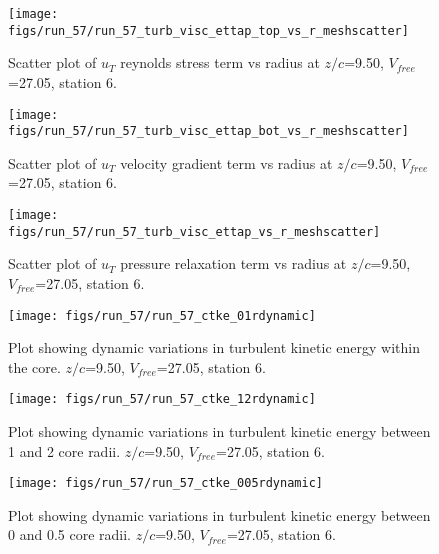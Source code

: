 \begin{figure}[H]
\centering
\texttt{[image: figs/run\_57/run\_57\_turb\_visc\_ettap\_top\_vs\_r\_meshscatter]}
\caption{Scatter plot of $
u_T$ reynolds stress term vs radius at $z/c$=9.50, $V_{free}$=27.05, station 6.}
\label{fig:run_57_turb_visc_ettap_top_vs_r_meshscatter}
\end{figure}


\begin{figure}[H]
\centering
\texttt{[image: figs/run\_57/run\_57\_turb\_visc\_ettap\_bot\_vs\_r\_meshscatter]}
\caption{Scatter plot of $
u_T$ velocity gradient term vs radius at $z/c$=9.50, $V_{free}$=27.05, station 6.}
\label{fig:run_57_turb_visc_ettap_bot_vs_r_meshscatter}
\end{figure}


\begin{figure}[H]
\centering
\texttt{[image: figs/run\_57/run\_57\_turb\_visc\_ettap\_vs\_r\_meshscatter]}
\caption{Scatter plot of $
u_T$ pressure relaxation term vs radius at $z/c$=9.50, $V_{free}$=27.05, station 6.}
\label{fig:run_57_turb_visc_ettap_vs_r_meshscatter}
\end{figure}


\begin{figure}[H]
\centering
\texttt{[image: figs/run\_57/run\_57\_ctke\_01rdynamic]}
\caption{Plot showing dynamic variations in turbulent kinetic energy within the core. $z/c$=9.50, $V_{free}$=27.05, station 6.}
\label{fig:run_57_ctke_01rdynamic}
\end{figure}


\begin{figure}[H]
\centering
\texttt{[image: figs/run\_57/run\_57\_ctke\_12rdynamic]}
\caption{Plot showing dynamic variations in turbulent kinetic energy between 1 and 2 core radii. $z/c$=9.50, $V_{free}$=27.05, station 6.}
\label{fig:run_57_ctke_12rdynamic}
\end{figure}


\begin{figure}[H]
\centering
\texttt{[image: figs/run\_57/run\_57\_ctke\_005rdynamic]}
\caption{Plot showing dynamic variations in turbulent kinetic energy between 0 and 0.5 core radii. $z/c$=9.50, $V_{free}$=27.05, station 6.}
\label{fig:run_57_ctke_005rdynamic}
\end{figure}


